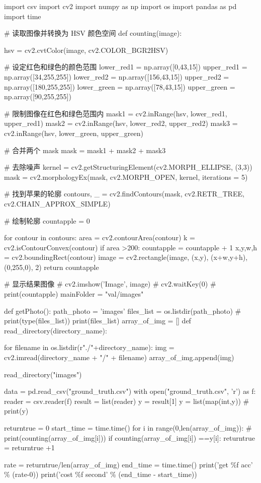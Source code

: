 \begin{python}
import csv
import cv2
import numpy as np
import os
import pandas as pd
import time

# 读取图像并转换为 HSV 颜色空间
def counting(image):

    hsv = cv2.cvtColor(image, cv2.COLOR_BGR2HSV)

    # 设定红色和绿色的颜色范围
    lower_red1 = np.array([0,43,15])
    upper_red1 = np.array([34,255,255])
    lower_red2 = np.array([156,43,15])
    upper_red2 = np.array([180,255,255])
    lower_green = np.array([78,43,15])
    upper_green = np.array([90,255,255])

    # 限制图像在红色和绿色范围内
    mask1 = cv2.inRange(hsv, lower_red1, upper_red1)
    mask2 = cv2.inRange(hsv, lower_red2, upper_red2)
    mask3 = cv2.inRange(hsv, lower_green, upper_green)

    # 合并两个 mask
    mask = mask1 + mask2 + mask3

    # 去除噪声
    kernel = cv2.getStructuringElement(cv2.MORPH_ELLIPSE, (3,3))
    mask = cv2.morphologyEx(mask, cv2.MORPH_OPEN, kernel, iterations = 5)

    # 找到苹果的轮廓
    contours, _ = cv2.findContours(mask, cv2.RETR_TREE, cv2.CHAIN_APPROX_SIMPLE)

    # 绘制轮廓
    countapple = 0

    for contour in contours:
        area = cv2.contourArea(contour)
        k = cv2.isContourConvex(contour)
        if area >200:
            countapple = countapple + 1
        x,y,w,h = cv2.boundingRect(contour)
        image = cv2.rectangle(image, (x,y), (x+w,y+h), (0,255,0), 2)
    return countapple

# 显示结果图像
# cv2.imshow('Image', image)
# cv2.waitKey(0)
# print(countapple)
mainFolder = "val/images"

def getPhoto():
    path_photo = 'images'
    files_list = os.listdir(path_photo)
    #
    print(type(files_list))
    print(files_list)
array_of_img = []
def read_directory(directory_name):

    for filename in os.listdir(r"./"+directory_name):
        img = cv2.imread(directory_name + "/" + filename)
        array_of_img.append(img)

read_directory("images")


data = pd.read_csv("ground_truth.csv")
with open("ground_truth.csv", 'r') as f:
    reader = csv.reader(f)
    result = list(reader)
y = result[1]
y = list(map(int,y))
# print(y)

returntrue = 0
start_time = time.time()
for i in range(0,len(array_of_img)):
    # print(counting(array_of_img[i]))
    if counting(array_of_img[i]) ==y[i]:
        returntrue = returntrue +1

rate = returntrue/len(array_of_img)
end_time = time.time()
print('get \%f acc' \% (rate-0))
print('cost \%f second' \% (end_time - start_time))
\end{python}